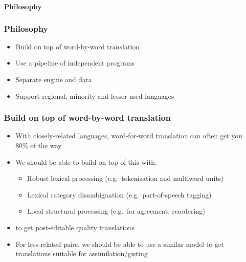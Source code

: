 \documentclass[10pt,xetex]{beamer} %
\begin{document}

\begin{frame} %
 \begin{center}
 {\Large {\bf Philosophy}}
 \end{center}
\end{frame}


\begin{frame}
 \frametitle{Philosophy} 

\begin{itemize} 
  \item Build on top of word-by-word translation
  \item Use a pipeline of independent programs 
  \item Separate engine and data
  \item Support regional, minority and lesser-used languages
\end{itemize}

\end{frame}

\begin{frame}
  \frametitle{Build on top of word-by-word translation}

\begin{itemize}
  \item With closely-related languages, word-for-word translation can often get you 80\% of the way
  \item We should be able to build on top of this with:
  \begin{itemize}
    \item Robust lexical processing (e.g.\ tokenisation and multiword units)
    \item Lexical category disambiguation (e.g.\ part-of-speech tagging)
    \item Local structural processing (e.g.\ for agreement, reordering)
  \end{itemize}
  \item to get post-editable quality translations
  \item For less-related pairs, we should be able to use a similar model to get
      translations suitable for assimilation/gisting
\end{itemize} 



\end{frame}
\end{document}
